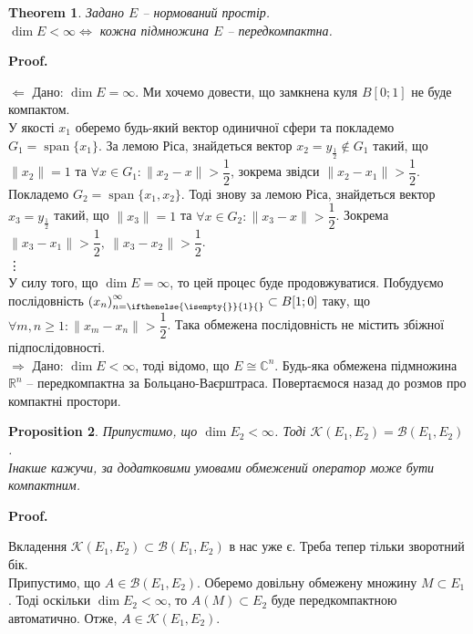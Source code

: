 \documentclass[a4paper, 10pt]{article}
\makeatletter
\def\rightproof{$\boxed{\Rightarrow}$ }
\def\leftproof{$\boxed{\Leftarrow}$ }
\theoremstyle{theoremdd}
\newtheorem{theorem}{Theorem}[subsection]
\theoremstyle{theoremdd}
\theoremstyle{theoremdd}
\theoremstyle{theoremdd}
\theoremstyle{theoremdd}
\newtheorem{proposition}[theorem]{Proposition}
\theoremstyle{theoremdd}
\theoremstyle{theoremdd}
\theoremstyle{theoremdd}
\newcommand{\sequence}[2][]{\left({#2}\right)_{n=\ifthenelse{\isempty{#1}}{1}{#1}}^{\infty}}
\renewenvironment{proof}[1][Proof.\\]{\par
\pushQED{\hfill \qed}%
\normalfont \topsep6\p@\@plus6\p@\relax
\trivlist
\item\relax
{\bfseries
#1\@addpunct{.}}\hspace\labelsep\ignorespaces
}{%
\popQED\endtrivlist\@endpefalse
}
\DeclareMathOperator{\linspan}{span}
\makeatother
\begin{document}
\begin{theorem}
Задано $E$ -- нормований простір.\\
$\dim E < \infty \iff$ кожна підмножина $E$ -- передкомпактна.
\end{theorem}

\begin{proof}
\leftproof Дано: $\dim E = \infty$. Ми хочемо довести, що замкнена куля $B[0;1]$ не буде компактом.\\
У якості $x_1$ оберемо будь-який вектор одиничної сфери та покладемо $G_1 = \linspan\{x_1\}$. За лемою Ріса, знайдеться вектор $x_2 = y_{\frac{1}{2}} \notin G_1$ такий, що $\|x_2\| = 1$ та $\forall x \in G_1: \|x_2-x\| > \dfrac{1}{2}$, зокрема звідси $\|x_2 - x_1\| > \dfrac{1}{2}$.\\
Покладемо $G_2 = \linspan\{x_1,x_2\}$. Тоді знову за лемою Ріса, знайдеться вектор $x_3 = y_{\frac{1}{2}}$ такий, що $\|x_3\| = 1$ та $\forall x \in G_2: \|x_3-x\| > \dfrac{1}{2}$. Зокрема $\|x_3 - x_1\| > \dfrac{1}{2},\ \|x_3 - x_2\| > \dfrac{1}{2}$.\\
\vdots \\
У силу того, що $\dim E = \infty$, то цей процес буде продовжуватися. Побудуємо послідовність $\sequence{x_n} \subset B[1;0]$ таку, що $\forall m,n \geq 1: \| x_m - x_n \| > \dfrac{1}{2}$. Така обмежена послідовність не містить збіжної підпослідовності.
\bigskip \\
\rightproof Дано: $\dim E < \infty$, тоді відомо, що $E \cong \mathbb{C}^n$. Будь-яка обмежена підмножина $\mathbb{R}^n$ -- передкомпактна за Больцано-Ваєрштраса.
\end{proof}
\noindent
Повертаємося назад до розмов про компактні простори.

\begin{proposition}
Припустимо, що $\dim E_2 < \infty$. Тоді $\mathcal{K}(E_1,E_2) = \mathcal{B}(E_1,E_2)$.\\
Інакше кажучи, за додатковими умовами обмежений оператор може бути компактним.
\end{proposition}

\begin{proof}
Вкладення $\mathcal{K}(E_1,E_2) \subset \mathcal{B}(E_1,E_2)$ в нас уже є. Треба тепер тільки зворотний бік.\\
Припустимо, що $A \in \mathcal{B}(E_1,E_2)$. Оберемо довільну обмежену множину $M \subset E_1$. Тоді оскільки $\dim E_2 < \infty$, то $A(M) \subset E_2$ буде передкомпактною автоматично. Отже, $A \in \mathcal{K}(E_1,E_2)$.
\end{proof}
\end{document}
